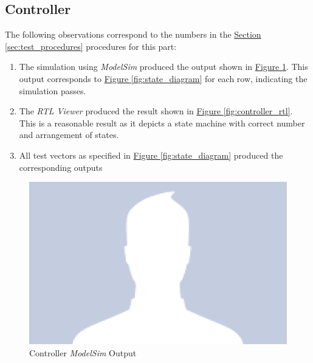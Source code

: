 
\subsection{Controller} %
\label{sub:controller}

The following observations correspond to the numbers in the \hyperref[sec:test_procedures]{Section \ref*{sec:test_procedures}} procedures for this part:

\begin{enumerate}
    \item The simulation using \emph{ModelSim} produced the output shown in \hyperref[fig:controller_output]{Figure \ref*{fig:controller_output}}.
    This output corresponds to \hyperref[fig:state_diagram]{Figure \ref*{fig:state_diagram}} for each row, indicating the simulation passes.
    \item The \emph{RTL Viewer} produced the result shown in \hyperref[fig:controller_rtl]{Figure \ref*{fig:controller_rtl}}.
    This is a reasonable result as it depicts a state machine with correct number and arrangement of states.
    \item All test vectors as specified in \hyperref[fig:state_diagram]{Figure \ref*{fig:state_diagram}} produced the corresponding outputs
\end{enumerate}

\begin{figure}[htbp]
    \includegraphics[width=\textwidth]{images/controller_output.png}
    \caption{Controller \emph{ModelSim} Output\label{fig:controller_output}}
\end{figure}

